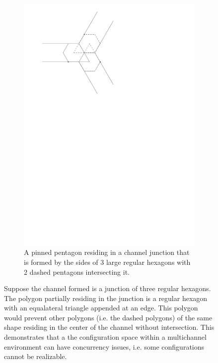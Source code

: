 \begin{figure}[h]
\begin{center}
\begin{subfigure}[b]{0.49\textwidth}
	  \includegraphics[width=\textwidth]{graphics/switchTerminalFinalized3.pdf}
	  \caption{A pinned pentagon residing in a channel junction that is formed by the sides of 
3 large regular hexagons with 2 dashed pentagons intersecting it.}
	  \label{fig:linkage-2-2}
  \end{subfigure}
\caption{Suppose the channel formed is a junction of three regular hexagons.  The polygon partially 
residing in the junction is a regular hexagon with an equalateral triangle appended at an edge.  
This polygon would prevent other polygons (i.e. the dashed polygons) of the same shape residing in 
the center of the channel without intersection. This demonstrates that a the configuration space 
within a multichannel environment can have concurrency issues, i.e. some configurations cannot be 
realizable.}
\end{center} \label{fig:linkage-2}
\end{figure}\newpage

